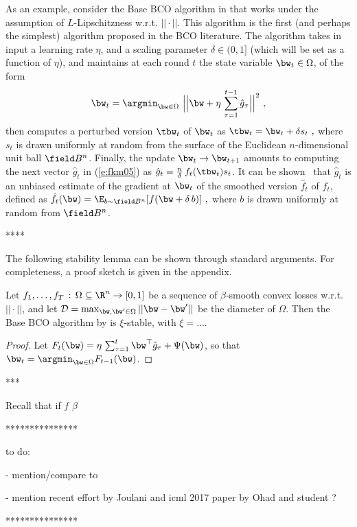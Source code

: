 %
As an example, consider the Base BCO algorithm in \cite{fkm05} that works under the assumption of $L$-Lipschitzness w.r.t. $||\cdot||$. This algorithm is the first (and perhaps the simplest) algorithm proposed in the BCO literature. The algorithm takes in input a learning rate $\eta$, and a scaling parameter $\delta \in (0,1]$ (which will be set as a function of $\eta$), and maintains at each round $t$ the state variable $\bw_t \in \Omega$, of the form
%
\begin{equation}\label{e:fkm05}
\bw_t = \argmin_{\bw\in \Omega}\ \Bigl|\Bigl|\bw+\eta\,\sum_{\tau = 1}^{t-1} {\hat g_{\tau}}\Bigl|\Bigl|^2~,
\end{equation}
%
then computes a perturbed version $\tbw_t$ of $\bw_t$ as 
\(
\tbw_t = \bw_t + \delta s_t~,
\)
where $s_t$ is drawn uniformly at random from the surface of the Euclidean $n$-dimensional unit ball $\B^n$. Finally, the update $\bw_t \rightarrow \bw_{t+1}$ amounts to computing the next vector ${\hat g_{t}}$ in (\ref{e:fkm05}) as ${\hat g_{t}} = \frac{n}{\delta}\,f_t(\tbw_t)s_t$. It can be shown~\citep{fkm05} that  ${\hat g_{t}}$ is an unbiased estimate of the gradient at $\bw_t$ of the smoothed version ${\hat f_t}$ of $f_t$, defined as
\(
{\hat f_t}(\bw) = \E_{b\sim \B^n} [f(\bw+\delta\,b)]~,
\)
where $b$ is drawn uniformly at random from $\B^n$. 


****

The following stability lemma can be shown through standard arguments. For completeness, a proof sketch is given in the appendix.
%
\begin{lemma}\label{l:stabilityconvexscrible}
Let $f_1,\ldots,f_T\,:\,\Omega \subseteq \R^n \rightarrow [0, 1]$ be a sequence of $\beta$-smooth convex losses w.r.t. $||\cdot||$, and let $\scD = \max_{\bw,\bw'\in \Omega} ||\bw-\bw'||$ be the diameter of $\Omega$. Then the Base BCO algorithm by \cite{st11} is $\xi$-stable, with $\xi = ...$. 
\end{lemma}
%
\begin{proof}
Let $F_t(\bw) = \eta\,\sum_{\tau = 1}^{t} \bw^\top{\hat g_{\tau}} + \Psi(\bw)$, so that $\bw_t = \argmin_{\bw\in\Omega} F_{t-1}(\bw)$.
\end{proof}



***



Recall that if $f$ $\beta$






***************

to do:

- mention/compare to \cite{ahm15}

- mention recent effort by Joulani and icml 2017 paper by Ohad and student ?


***************
